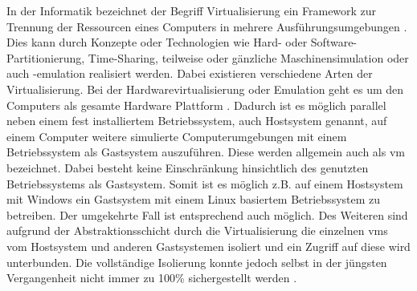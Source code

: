 In der Informatik bezeichnet der Begriff Virtualisierung ein Framework zur Trennung der Ressourcen eines Computers in mehrere Ausführungsumgebungen \cite{virtualization}. Dies kann durch Konzepte oder Technologien wie Hard- oder Software-Partitionierung, Time-Sharing, teilweise oder gänzliche Maschinensimulation oder auch -emulation realisiert werden. Dabei existieren verschiedene Arten der Virtualisierung. Bei der Hardwarevirtualisierung oder Emulation geht es um den Computers als gesamte Hardware Plattform \cite{wiki:hardware_virtual}. Dadurch ist es möglich parallel neben einem fest installiertem Betriebssystem, auch Hostsystem genannt, auf einem Computer weitere simulierte Computerumgebungen mit einem Betriebssystem als Gastsystem auszuführen. Diese werden allgemein auch als \ac{vm} bezeichnet. Dabei besteht keine Einschränkung hinsichtlich des genutzten Betriebssystems als Gastsystem. Somit ist es möglich z.B. auf einem Hostsystem mit Windows ein Gastsystem mit einem Linux basiertem Betriebssystem zu betreiben. Der umgekehrte Fall ist entsprechend auch möglich. Des Weiteren sind aufgrund der Abstraktionsschicht durch die Virtualisierung die einzelnen \acp{vm} vom Hostsystem und anderen Gastsystemen isoliert und ein Zugriff auf diese wird unterbunden. Die vollständige Isolierung konnte jedoch selbst in der jüngsten Vergangenheit nicht immer zu 100\% sichergestellt werden \cite{CVE-2017-4934}.

